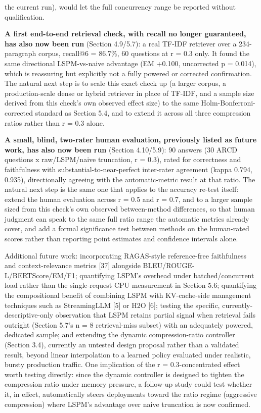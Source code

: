 the current run), would let the full concurrency range be reported without qualification.

\textbf{A first end-to-end retrieval check, with recall no longer guaranteed, has also now been run} (Section 4.9/5.7): a real TF-IDF retriever over a 234-paragraph corpus, recall@6 = 86.7\%, 60 questions at r = 0.3 only. It found the same directional LSPM-vs-naive advantage (EM +0.100, uncorrected p = 0.014), which is reassuring but explicitly not a fully powered or corrected confirmation. The natural next step is to scale this exact check up (a larger corpus, a production-scale dense or hybrid retriever in place of TF-IDF, and a sample size derived from this check's own observed effect size) to the same Holm-Bonferroni-corrected standard as Section 5.4, and to extend it across all three compression ratios rather than r = 0.3 alone.

\textbf{A small, blind, two-rater human evaluation, previously listed as future work, has also now been run} (Section 4.10/5.9): 90 answers (30 ARCD questions x raw/LSPM/naive truncation, r = 0.3), rated for correctness and faithfulness with substantial-to-near-perfect inter-rater agreement (kappa 0.794, 0.935), directionally agreeing with the automatic-metric result at that ratio. The natural next step is the same one that applies to the accuracy re-test itself: extend the human evaluation across r = 0.5 and r = 0.7, and to a larger sample sized from this check's own observed between-method differences, so that human judgment can speak to the same full ratio range the automatic metrics already cover, and add a formal significance test between methods on the human-rated scores rather than reporting point estimates and confidence intervals alone.

Additional future work: incorporating RAGAS-style reference-free faithfulness and context-relevance metrics [37] alongside BLEU/ROUGE-L/BERTScore/EM/F1; quantifying LSPM's overhead under batched/concurrent load rather than the single-request CPU measurement in Section 5.6; quantifying the compositional benefit of combining LSPM with KV-cache-side management techniques such as StreamingLLM [5] or H2O [6]; testing the specific, currently-descriptive-only observation that LSPM retains partial signal when retrieval fails outright (Section 5.7's n = 8 retrieval-miss subset) with an adequately powered, dedicated sample; and extending the dynamic compression-ratio controller (Section 3.4), currently an untested design proposal rather than a validated result, beyond linear interpolation to a learned policy evaluated under realistic, bursty production traffic. One implication of the r = 0.3-concentrated effect worth testing directly: since the dynamic controller is designed to tighten the compression ratio under memory pressure, a follow-up study could test whether it, in effect, automatically steers deployments toward the ratio regime (aggressive compression) where LSPM's advantage over naive truncation is now confirmed.

